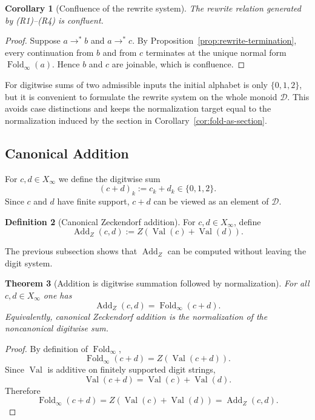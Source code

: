 \documentclass[11pt,letterpaper]{article}
\numberwithin{equation}{section}
\theoremstyle{plain}
\newtheorem{theorem}{Theorem}[section]
\newtheorem{corollary}[theorem]{Corollary}
\theoremstyle{definition}
\newtheorem{definition}[theorem]{Definition}
\theoremstyle{remark}
\newcommand{\D}{\mathcal{D}}
\newcommand{\Xinf}{X_\infty}
\newcommand{\leanverified}[1]{}
\DeclareMathOperator{\Val}{Val}
\DeclareMathOperator{\Fold}{Fold}
\newcommand{\ZAdd}{\operatorname{Add}_{Z}}
\begin{document}
\begin{corollary}[Confluence of the rewrite system]\label{cor:rewrite-confluence}
The rewrite relation generated by \textup{(R1)}--\textup{(R4)} is confluent.
\end{corollary}

\begin{proof}
Suppose $a\to^\ast b$ and $a\to^\ast c$.  By
Proposition~\ref{prop:rewrite-termination}, every continuation from $b$ and
from $c$ terminates at the unique normal form $\Fold_\infty(a)$.  Hence $b$
and $c$ are joinable, which is confluence.
\end{proof}

For digitwise sums of two admissible inputs the initial alphabet is only
$\{0,1,2\}$, but it is convenient to formulate the rewrite system on the whole
monoid $\D$.  This avoids case distinctions and keeps the normalization target
equal to the normalization induced by the section in
Corollary~\ref{cor:fold-as-section}.

\subsection{Canonical Addition}

For $c,d\in \Xinf$ we define the digitwise sum
\[
(c+d)_k:=c_k+d_k \in \{0,1,2\}.
\]
Since $c$ and $d$ have finite support, $c+d$ can be viewed as an element of
$\D$.

\begin{definition}[Canonical Zeckendorf addition]\label{def:stable-add}
For $c,d\in\Xinf$, define
\[
\ZAdd(c,d):=Z(\Val(c)+\Val(d)).
\]
\end{definition}

The previous subsection shows that $\ZAdd$ can be computed without leaving the
digit system.

\begin{theorem}[Addition is digitwise summation followed by normalization]\label{thm:zeckendorf-add-fst}
For all $c,d\in \Xinf$ one has
\[
\ZAdd(c,d)=\Fold_\infty(c+d).
\]
Equivalently, canonical Zeckendorf addition is the normalization of the
noncanonical digitwise sum.
\leanverified{paper_zeckendorf_add_fst}
\end{theorem}

\begin{proof}
By definition of $\Fold_\infty$,
\[
\Fold_\infty(c+d)=Z(\Val(c+d)).
\]
Since $\Val$ is additive on finitely supported digit strings,
\[
\Val(c+d)=\Val(c)+\Val(d).
\]
Therefore
\[
\Fold_\infty(c+d)=Z(\Val(c)+\Val(d))=\ZAdd(c,d).
\]
\end{proof}
\end{document}
